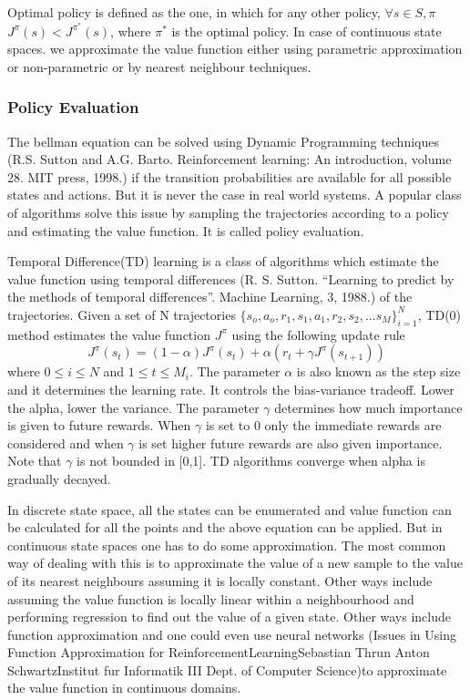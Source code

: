 \documentclass[MTech]{iitmdiss}
\begin{document}
Optimal policy is defined as the one, in which for any other policy,  $\forall s\in S,  \pi$ $J^{\pi}(s) < J^{\pi^*}(s)$, where $\pi^*$ is the optimal policy. In case of continuous state spaces. we approximate the value function either using parametric approximation or non-parametric or by nearest neighbour techniques. 

\subsubsection{Policy Evaluation}

The bellman equation can be solved using Dynamic Programming techniques (R.S. Sutton and A.G. Barto. Reinforcement learning: An introduction, volume 28. MIT press, 1998.) if the transition probabilities are available for all possible states and actions. But it is never the case in real world systems. A popular class of algorithms solve this issue by sampling the trajectories according to a policy and estimating the value function. It is called policy evaluation. 

Temporal Difference(TD) learning is a class of algorithms which estimate the value function using temporal differences (R. S. Sutton. “Learning to predict by the methods of temporal differences”. Machine Learning, 3, 1988.) of the trajectories. Given a set of N trajectories $\{s_o,a_o,r_1,s_1,a_1,r_2,s_2,... s_M\}_{i=1}^N$, TD(0) method estimates the value function $J^\pi$ using the following update rule 
$$J^{\pi}(s_t) = (1 - \alpha) J^{\pi}(s_t) + \alpha (r_t + \gamma J^{\pi}(s_{t+1})) $$ 
where $0 \leq  i \leq N$ and $1 \leq t \leq M_i$. The parameter $\alpha$ is also known as the step size and it determines the learning rate. It controls the bias-variance tradeoff. Lower the alpha, lower the variance. The parameter $\gamma$ determines how much importance is given to future rewards. When $\gamma $ is set to 0 only the immediate rewards are considered and when $\gamma$ is set higher future rewards are also given importance. Note that $\gamma$ is not bounded in [0,1].  TD algorithms converge when alpha is gradually decayed. 

In discrete state space, all the states can be enumerated and value function can be calculated for all the points and the above equation can be applied. But in continuous state spaces one has to do some approximation. The most common way of dealing with this is to approximate the value of a new sample to the value of its nearest neighbours assuming it is locally constant. Other ways include assuming the value function is locally linear within a neighbourhood and performing regression to find out the value of a given state. Other ways include function approximation and one could even use neural networks (Issues in Using Function Approximation for ReinforcementLearningSebastian Thrun Anton SchwartzInstitut fur Informatik III Dept. of Computer Science)to approximate the value function in continuous domains.
\end{document}
